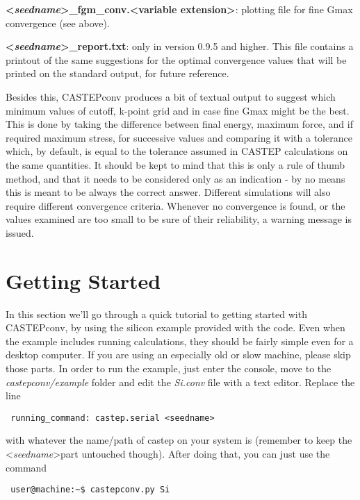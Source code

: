 \documentclass[10pt]{article}
\begin{document}
\textbf{\textless \textit{seedname}\textgreater\_fgm\_conv.\textless variable extension\textgreater}: plotting file for fine Gmax convergence (see above).

\textbf{\textless \textit{seedname}\textgreater\_report.txt}: only in version
0.9.5 and higher. This file contains a printout of the same suggestions for
the optimal convergence values that will be printed on the standard output,
for future reference.

Besides this, CASTEPconv produces a bit of textual output to suggest which 
minimum values of cutoff, k-point grid and in case fine Gmax might be the best. This is done by 
taking the difference between final energy, maximum force, and if required 
maximum stress, for successive values and comparing it with a tolerance which, 
by default, is equal to the tolerance assumed in CASTEP calculations on the same 
quantities. It should be kept to mind that this is only a rule of thumb method, 
and that it needs to be considered only as an indication - by no means this is 
meant to be always the correct answer. Different simulations will also require 
different convergence criteria. Whenever no convergence is found, or the values 
examined are too small to be sure of their reliability, a warning message is 
issued.

\section{Getting Started}

In this section we'll go through a quick tutorial to getting started with CASTEPconv, by using the silicon example provided with the code. Even when the example includes running calculations, they should be fairly simple even for a desktop computer. If you are using an especially old or slow machine, please skip those parts.\newline
In order to run the example, just enter the console, move to the \textit{castepconv/example} folder and edit the \textit{Si.conv} file with a text editor. Replace the line

\begin{lstlisting}
 running_command: castep.serial <seedname>
\end{lstlisting}

with whatever the name/path of castep on your system is (remember to keep the \textless \textit{seedname}\textgreater part untouched though). After doing that, you can just use the command

\begin{lstlisting}
 user@machine:~$ castepconv.py Si
\end{lstlisting}
\end{document}
